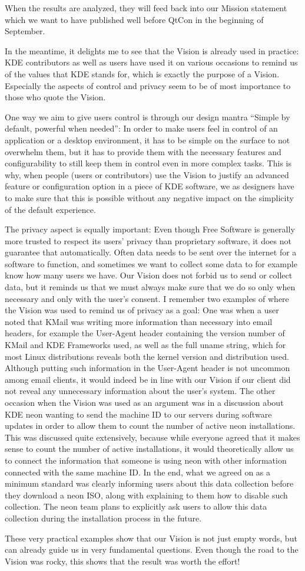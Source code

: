 When the results are analyzed, they will feed back into our Mission statement which we want to have published well before QtCon in the beginning of September.

In the meantime, it delights me to see that the Vision is already used in practice: KDE contributors as well as users have used it on various occasions to remind us of the values that KDE stands for, which is exactly the purpose of a Vision. Especially the aspects of control and privacy seem to be of most importance to those who quote the Vision. 

One way we aim to give users control is through our design mantra ``Simple by default, powerful when needed'': In order to make users feel in control of an application or a desktop environment, it has to be simple on the surface to not overwhelm them, but it has to provide them with the necessary features and configurability to still keep them in control even in more complex tasks. This is why, when people (users or contributors) use the Vision to justify an advanced feature or configuration option in a piece of KDE software, we as designers have to make sure that this is possible without any negative impact on the simplicity of the default experience.

The privacy aspect is equally important: Even though Free Software is generally more trusted to respect its users' privacy than proprietary software, it does not guarantee that automatically. Often data needs to be sent over the internet for a software to function, and sometimes we want to collect some data to for example know how many users we have. Our Vision does not forbid us to send or collect data, but it reminds us that we must always make sure that we do so only when necessary and only with the user's consent. I remember two examples of where the Vision was used to remind us of privacy as a goal: One was when a user noted that KMail was writing more information than necessary into email headers, for example the User-Agent header containing the version number of KMail and KDE Frameworks used, as well as the full uname string, which for most Linux distributions reveals both the kernel version and distribution used. Although putting such information in the User-Agent header is not uncommon among email clients, it would indeed be in line with our Vision if our client did not reveal any unnecessary information about the user's system. The other occasion when the Vision was used as an argument was in a discussion about KDE neon wanting to send the machine ID to our servers during software updates in order to allow them to count the number of active neon installations. This was discussed quite extensively, because while everyone agreed that it makes sense to count the number of active installations, it would theoretically allow us to connect the information that someone is using neon with other information connected with the same machine ID. In the end, what we agreed on as a minimum standard was clearly informing users about this data collection before they download a neon ISO, along with explaining to them how to disable such collection. The neon team plans to explicitly ask users to allow this data collection during the installation process in the future.

These very practical examples show that our Vision is not just empty words, but can already guide us in very fundamental questions. Even though the road to the Vision was rocky, this shows that the result was worth the effort!
